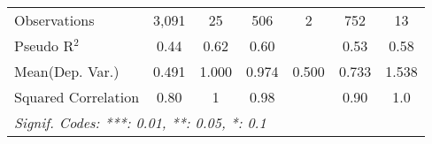 \begin{tabular}{lcccccc}
   Observations                                               & 3,091         & 25           & 506           & 2    & 752           & 13\\  
   Pseudo R$^2$                                               & 0.44          & 0.62         & 0.60          &      & 0.53          & 0.58\\  
Mean(Dep. Var.) & 0.491 & 1.000 & 0.974 & 0.500 & 0.733 & 1.538 \\
   Squared Correlation                                        & 0.80          & 1            & 0.98          &      & 0.90          & 1.0\\  
   \midrule \midrule
   \multicolumn{7}{l}{\emph{Signif. Codes: ***: 0.01, **: 0.05, *: 0.1}}\\
\end{tabular}
\par\endgroup

